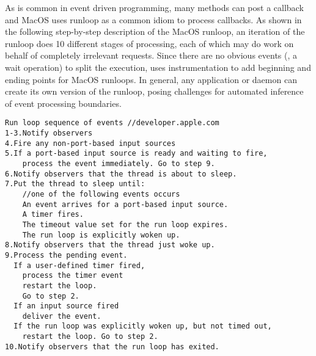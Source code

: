 As is common in event driven programming, many methods can post a callback
and MacOS uses runloop as a common idiom to process callbacks.  As shown
in the following step-by-step description of the MacOS runloop, an
iteration of the runloop does 10 different stages of processing, each of
which may do work on behalf of completely irrelevant requests.  Since
there are no obvious events (\eg, a wait operation) to split the
execution, \xxx uses instrumentation to add beginning and ending points
for MacOS runloops.  In general, any application or daemon can create
its own version of the runloop, posing challenges for automated
inference of event processing boundaries.


{\footnotesize \begin{verbatim}
Run loop sequence of events //developer.apple.com
1-3.Notify observers
4.Fire any non-port-based input sources
5.If a port-based input source is ready and waiting to fire,
    process the event immediately. Go to step 9.
6.Notify observers that the thread is about to sleep.
7.Put the thread to sleep until:
    //one of the following events occurs
    An event arrives for a port-based input source.
    A timer fires.
    The timeout value set for the run loop expires.
    The run loop is explicitly woken up.
8.Notify observers that the thread just woke up.
9.Process the pending event.
  If a user-defined timer fired,
    process the timer event
    restart the loop.
    Go to step 2.
  If an input source fired
    deliver the event.
  If the run loop was explicitly woken up, but not timed out,
    restart the loop. Go to step 2.
10.Notify observers that the run loop has exited.

\end{verbatim}
}




